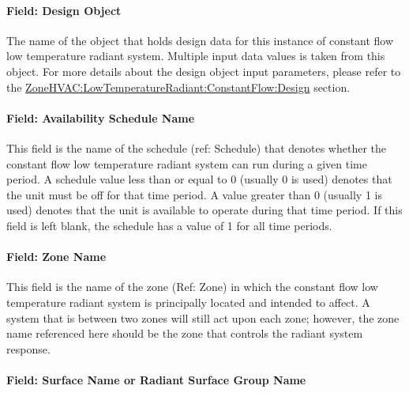 \paragraph{Field: Design Object}\label{DesignObjectName}

The name of the object that holds design data for this instance of constant flow low temperature radiant system. Multiple input data values is taken from this object. For more details about the design object input parameters, please refer to the \hyperref[ConstFlowDesign]{ZoneHVAC:LowTemperatureRadiant:ConstantFlow:Design} section.

\paragraph{Field: Availability Schedule Name}\label{field-availability-schedule-name-6-003}

This field is the name of the schedule (ref: Schedule) that denotes whether the constant flow low temperature radiant system can run during a given time period. A schedule value less than or equal to 0 (usually 0 is used) denotes that the unit must be off for that time period. A value greater than 0 (usually 1 is used) denotes that the unit is available to operate during that time period. If this field is left blank, the schedule has a value of 1 for all time periods.

\paragraph{Field: Zone Name}\label{field-zone-name-1-007}

This field is the name of the zone (Ref: Zone) in which the constant flow low temperature radiant system is principally located and intended to affect. A system that is between two zones will still act upon each zone; however, the zone name referenced here should be the zone that controls the radiant system response.

\paragraph{Field: Surface Name or Radiant Surface Group Name}\label{field-surface-name-or-radiant-surface-group-name-1}

